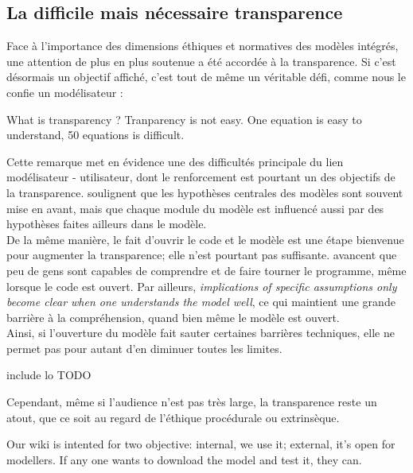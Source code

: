 \subsection{La difficile mais nécessaire transparence}

Face à l'importance des dimensions éthiques et normatives des modèles intégrés, une attention de plus en plus soutenue a été accordée à la transparence.  Si c'est désormais un objectif affiché, c'est tout de même un véritable défi, comme nous le confie un modélisateur : 

\begin{authoredquote}
    What is transparency ? Tranparency is not easy. One equation is easy to understand, 50 equations is difficult. 
\end{authoredquote}

Cette remarque met en évidence une des difficultés principale du lien modélisateur - utilisateur, dont le renforcement est pourtant un des objectifs de la transparence. \textcite{keppo_exploring_2021} soulignent que les hypothèses centrales des modèles sont souvent mise en avant, mais que chaque module du modèle est influencé  aussi par des hypothèses faites ailleurs dans le modèle. \\

De la même manière, le fait d'ouvrir le code et le modèle est une étape bienvenue pour augmenter la transparence; elle n'est pourtant pas suffisante. \textcite{keppo_exploring_2021} avancent que peu de gens sont capables de comprendre et de faire tourner le programme, même lorsque le code est ouvert. Par ailleurs, \emph{implications of specific assumptions only become clear when one understands the model well}, ce qui maintient une grande barrière à la compréhension, quand bien même le modèle est ouvert. \\

Ainsi, si l'ouverture du modèle fait sauter certaines barrières techniques, elle ne permet pas pour autant d'en diminuer toutes les limites. 

\begin{authoredquote}
    include lo TODO 
\end{authoredquote}

Cependant, même si l'audience n'est pas très large, la transparence reste un atout, que ce soit au regard de l'éthique procédurale ou extrinsèque. 



\begin{authoredquote}
Our wiki is intented for two objective: internal, we use it; external, it's open for modellers. If any one wants to download the model and test it, they can. 
\end{authoredquote}


